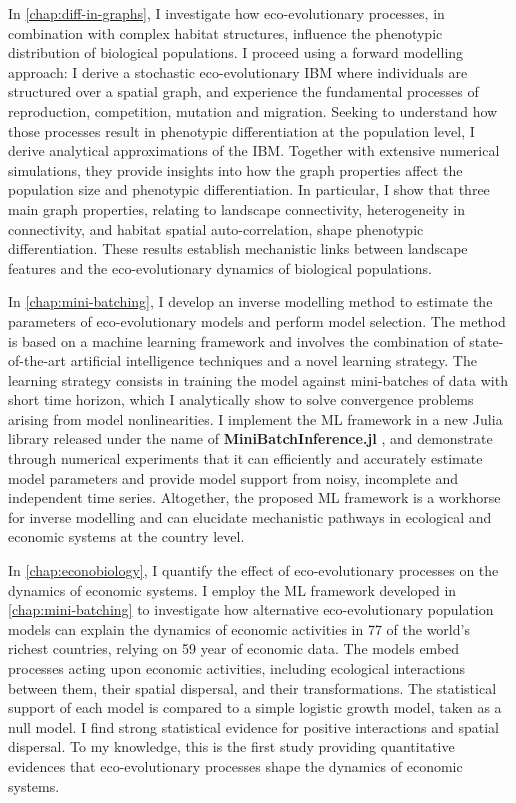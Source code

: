 In \cref{chap:diff-in-graphs}, I investigate how eco-evolutionary processes, in combination with complex habitat structures, influence the phenotypic distribution of biological populations. 
I proceed using a forward modelling approach: I derive a stochastic eco-evolutionary IBM where individuals are structured over a spatial graph, and experience the fundamental processes of reproduction, competition, mutation and migration. Seeking to understand how those processes result in phenotypic differentiation at the population level, I derive analytical approximations of the IBM. Together with extensive numerical simulations, they provide insights into how the graph properties affect the population size and phenotypic differentiation. In particular, I show that three main graph properties, relating to landscape connectivity, heterogeneity in connectivity, and habitat spatial auto-correlation, shape phenotypic differentiation. These results establish mechanistic links between landscape features and the eco-evolutionary dynamics of biological populations.

In \cref{chap:mini-batching}, I develop an inverse modelling method to estimate the parameters of eco-evolutionary models and perform model selection. The method is based on a machine learning framework and involves the combination of state-of-the-art artificial intelligence techniques and a novel learning strategy. The learning strategy consists in training the model against mini-batches of data with short time horizon, which I analytically show to solve convergence problems arising from model nonlinearities. I implement the ML framework in a new Julia library released under the name of \textbf{MiniBatchInference.jl} \citep{MiniBatchInference}, and demonstrate through numerical experiments that it can efficiently and accurately estimate model parameters and provide model support from noisy, incomplete and independent time series. Altogether, the proposed ML framework is a workhorse for inverse modelling and can elucidate mechanistic pathways in ecological and economic systems at the country level.

In \cref{chap:econobiology}, I quantify the effect of eco-evolutionary processes on the dynamics of economic systems. I employ the ML framework developed in \cref{chap:mini-batching} to investigate how alternative eco-evolutionary population models can explain the dynamics of economic activities in 77 of the world's richest countries, relying on 59 year of economic data. The models embed processes acting upon economic activities, including ecological interactions between them, their spatial dispersal, and their transformations. The statistical support of each model is compared to a simple logistic growth model, taken as a null model. I find strong statistical evidence for positive interactions and spatial dispersal. To my knowledge, this is the first study providing quantitative evidences that eco-evolutionary processes shape the dynamics of economic systems.

